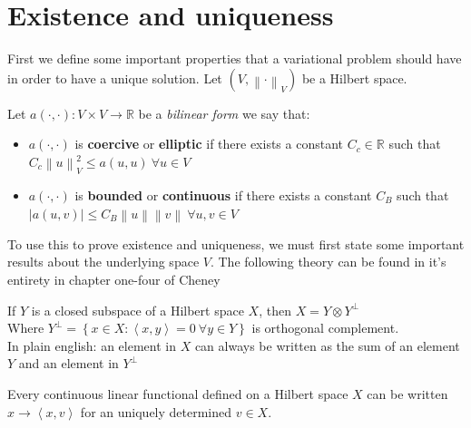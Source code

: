 \documentclass[../Main/main.tex]{subfiles}
\begin{document}
	\section*{Existence and uniqueness}
	First we define some important properties that a variational problem should have in order to have a unique solution. Let $(V,\left \| \cdot \right \|_V)$ be a Hilbert space.
	\begin{definition} Let $a(\cdot,\cdot):V\times V \rightarrow \mathbb{R}$ be a \emph{bilinear form} we say that:
			\begin{itemize}
			\item $a(\cdot,\cdot)$ is \textbf{coercive} or \textbf{elliptic} if there exists a constant $C_c\in \mathbb{R}$ such that $C_c\left \| u \right \|_V^2 \leq a(u,u) \ \forall u \in V$
			\item $a(\cdot,\cdot)$ is \textbf{bounded} or \textbf{continuous} if there exists a constant $C_B$ such that $|a(u,v)|\leq C_B\left \| u \right \|\left \| v \right \| \ \forall u,v \in V$
			\end{itemize}
	\end{definition}
	To use this to prove existence and uniqueness, we must first state some important results about the underlying space $V$. The following theory can be found in it's entirety in chapter one-four of Cheney \cite{Cheney}
	\begin{theorem}\label{th:decomposition of hilbert}
		If $Y$ is a closed subspace of a Hilbert space $X$, then $X = Y\otimes Y^{\bot}$ \\
		Where $Y^{\bot} = \left \{ \left. x\in X: \left \langle x,y \right \rangle=0 \ \forall y \in Y \right \} \right.$ is orthogonal complement.\\ In plain english: an element in $X$ can always be written as the sum of an element $Y$ and an element in $Y^{\bot}$
	\end{theorem}
	\begin{theorem}\label{th:riesz representation}
		Every continuous linear functional defined on a Hilbert space $X$ can be written $x\rightarrow \left \langle x,v \right \rangle$ for an uniquely determined $v \in X$.
	\end{theorem}
\end{document}
